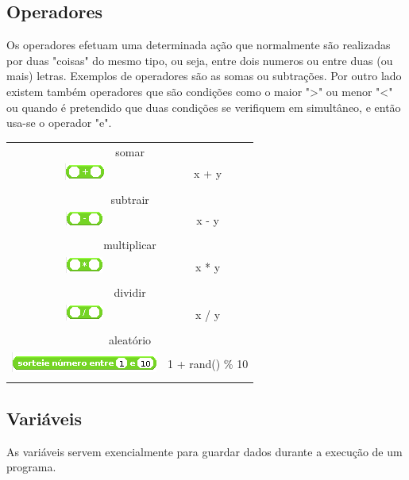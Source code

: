 \documentclass{article}
\begin{document}
\subsection{Operadores}
Os operadores efetuam uma determinada ação que normalmente são realizadas por duas "coisas" do mesmo tipo, ou seja, entre dois numeros ou entre duas (ou mais) letras. Exemplos de operadores são as somas ou subtrações. Por outro lado existem também operadores que são condições como o maior ">" ou menor "<" ou quando é pretendido que duas condições se verifiquem em simultâneo, e então usa-se o operador "e".


\begin{tabular}{ c c }
    \multicolumn{2}{c}{\LARGE{somar}} \\
    \includegraphics{imgs/operators/plus} & x + y \\ \\
    \multicolumn{2}{c}{\LARGE{subtrair}} \\
    \includegraphics{imgs/operators/minus} & x - y \\ \\
    \multicolumn{2}{c}{\LARGE{multiplicar}} \\
    \includegraphics{imgs/operators/multiply} & x * y \\ \\
    \multicolumn{2}{c}{\LARGE{dividir}} \\
    \includegraphics{imgs/operators/divide} & x / y \\ \\
    \multicolumn{2}{c}{\LARGE{aleatório}} \\
    \includegraphics{imgs/operators/random-between} & 1 + rand() \% 10 \\ \\
\end{tabular}

\subsection{Variáveis}
As variáveis servem exencialmente para guardar dados durante a execução de um programa.
\end{document}
